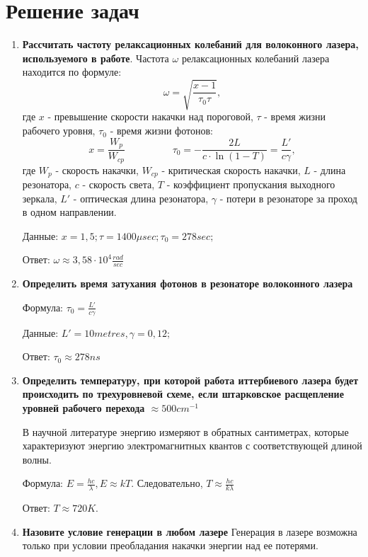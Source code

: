 \documentclass[a4paper]{article}
\begin{document}
\section{Решение задач}
\begin{enumerate}
\item \textbf{Рассчитать частоту релаксационных колебаний для волоконного лазера, используемого в работе}.
Частота $\omega$ релаксационных колебаний лазера находится по формуле: 
\begin{displaymath}
\omega = \sqrt{\frac{x-1}{\tau_0 \tau}},
\end{displaymath}
где $x$ - превышение скорости накачки над пороговой, $\tau$ - время жизни рабочего уровня, $\tau_0$ - время жизни фотонов:
\begin{displaymath}
x = \frac{W_p}{W_{cp}} \hspace{2cm} \tau_0 = - \frac{2L}{c \cdot \ln(1-T)} = \frac{L'}{c\gamma},
\end{displaymath}
где $W_p$ - скорость накачки, $W_{cp}$ - критическая скорость накачки, $L$
 - длина резонатора, $c$ - скорость света, $T$ - коэффициент пропускания выходного зеркала, $L'$ - оптическая длина резонатора, $\gamma$ - потери в резонаторе за проход в одном направлении.
 
Данные: $x = 1,5; \tau = 1400 \mu sec; \tau_0 = 278 sec; $

Ответ: $\omega \approx 3,58 \cdot 10^4 \frac{rad}{sec}$
 
 
 \item \textbf{Определить время затухания фотонов в резонаторе волоконного лазера}
 
 Формула: $\tau_0 = \frac{L'}{c\gamma}$
 
 Данные: $L' = 10 metres, \gamma = 0,12;$
 
 Ответ: $\tau_0 \approx 278 ns$
 
 \item \textbf{Определить температуру, при которой работа иттербиевого лазера будет происходить по трехуровневой схеме, если штарковское расщепление уровней рабочего перехода $\approx 500 cm^{-1}$}
 
 В научной литературе энергию измеряют в обратных сантиметрах, которые характеризуют энергию электромагнитных квантов с соответствующей длиной волны. 
 
 Формула: $E = \frac{hc}{\lambda}, E \approx kT$. Следовательно, $T \approx \frac{hc}{k\lambda}$

 Ответ: $T \approx 720 K$.
 
 \item \textbf{Назовите условие генерации в любом лазере}
 Генерация в лазере возможна только при условии преобладания накачки энергии над ее потерями.
 

\end{enumerate}
\end{document}
